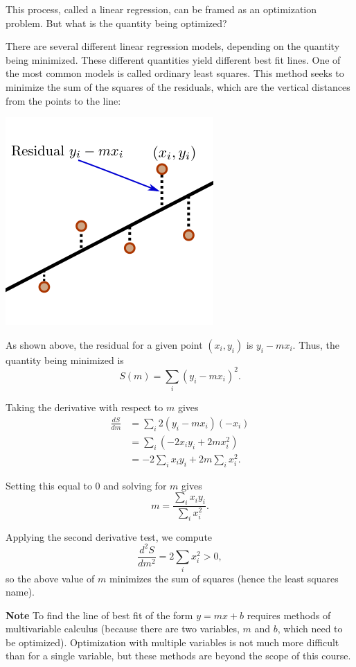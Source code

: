 \documentclass[twoside,openright,titlepage,a4paper]{book}
\begin{document}
\begin{sloppypar}
This process, called a linear regression, can be framed as an optimization problem. But what is the quantity being optimized?

There are several different linear regression models, depending on the quantity being minimized. These different quantities yield different best fit lines. One of the most common models is called ordinary least squares. This method seeks to minimize the sum of the squares of the residuals, which are the vertical distances from the points to the line:
\begin{center}\includegraphics[scale=0.6]{Residuals}\end{center}

As shown above, the residual for a given point $(x_i,y_i)$ is $y_i - mx_i$. Thus, the quantity being minimized is \[ S(m) = \sum_i (y_i - mx_i)^2. \]

Taking the derivative with respect to $m$ gives
\begin{align*} 
\frac{dS}{dm} &= \sum_i 2(y_i - mx_i)(-x_i) \\
&= \sum_i \left(-2x_iy_i + 2mx_i^2 \right) \\
&= -2 \sum_i x_i y_i + 2m \sum_i x_i^2.
\end{align*}

Setting this equal to 0 and solving for $m$ gives \[ m = \frac{\displaystyle \sum_i x_i y_i}{\displaystyle \sum_i x_i^2}. \]

Applying the second derivative test, we compute \[ \frac{d^2S}{dm^2} = 2 \sum_i x^2_i > 0, \] so the above value of $m$ minimizes the sum of squares (hence the least squares name).

\textbf{Note} To find the line of best fit of the form $y = mx+b$ requires methods of multivariable calculus (because there are two variables, $m$ and $b$, which need to be optimized). Optimization with multiple variables is not much more difficult than for a single variable, but these methods are beyond the scope of this course.


\end{sloppypar}
\end{document}
